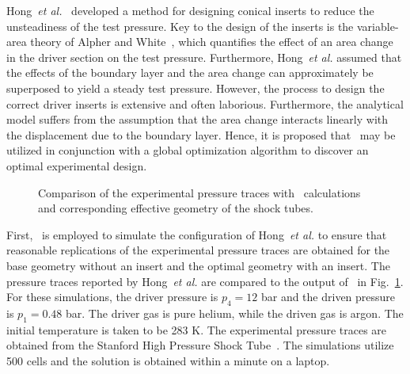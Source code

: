 Hong~\emph{et al.}~\cite{HONG_PANG_VASU_DAVIDSON_HANSON_SW2009} developed a method for designing conical inserts to reduce the unsteadiness of the test pressure. Key to the design of the inserts is the variable-area theory of Alpher and White~\cite{ALPHER_JFM58}, which quantifies the effect of an area change in the driver section on the test pressure. Furthermore, Hong~\emph{et al.} assumed that the effects of the boundary layer and the area change can approximately be superposed to yield a steady test pressure. However, the process to design the correct driver inserts is extensive and often laborious. Furthermore, the analytical model suffers from the assumption that the area change interacts linearly with the displacement due to the boundary layer. Hence, it is proposed that \stnshk\ may be utilized in conjunction with a global optimization algorithm to discover an optimal experimental design. 

\begin{figure}[!h!]
	\centering
	\caption{\label{FIG_HONG} Comparison of the experimental pressure traces with \stnshk\ calculations and corresponding effective geometry of the shock tubes.}
\end{figure}

First, \stnshk\ is employed to simulate the configuration of Hong~\emph{et al.} to ensure that reasonable replications of the experimental pressure traces are obtained for the base geometry without an insert and the optimal geometry with an insert. The pressure traces reported by Hong~\emph{et al.} are compared to the output of \stnshk\ in Fig.~\ref{FIG_HONG}. For these simulations, the driver pressure is $p_4=12$ bar and the driven pressure is $p_1=0.48$ bar. The driver gas is pure helium, while the driven gas is argon. The initial temperature is taken to be 283 K. The experimental pressure traces are obtained from the Stanford High Pressure Shock Tube~\cite{HONG_PANG_VASU_DAVIDSON_HANSON_SW2009}. The simulations utilize 500 cells and the solution is obtained within a minute on a laptop.  

